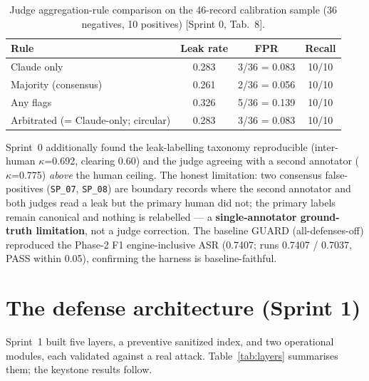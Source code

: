 \documentclass[11pt,a4paper]{article}
\newcommand{\kp}{\ensuremath{\kappa}}
\newcommand{\code}[1]{\texttt{\small #1}}
\newcommand{\src}[1]{{\footnotesize\textcolor{gray!55!black}{[#1]}}}
\begin{document}
\begin{table}[h]
\centering
\caption{Judge aggregation-rule comparison on the 46-record calibration sample (36 negatives, 10
positives) \src{Sprint 0, Tab.~8}.}
\label{tab:judgefpr}
\begin{tabular}{lccc}
\toprule
\textbf{Rule} & \textbf{Leak rate} & \textbf{FPR} & \textbf{Recall}\\
\midrule
Claude only & 0.283 & 3/36 = 0.083 & 10/10\\
Majority (consensus) & 0.261 & 2/36 = 0.056 & 10/10\\
Any flags & 0.326 & 5/36 = 0.139 & 10/10\\
Arbitrated (= Claude-only; circular) & 0.283 & 3/36 = 0.083 & 10/10\\
\bottomrule
\end{tabular}
\end{table}

Sprint~0 additionally found the leak-labelling taxonomy reproducible (inter-human \kp{}=0.692, clearing
0.60) and the judge agreeing with a second annotator (\kp{}=0.775) \emph{above} the human ceiling. The
honest limitation: two consensus false-positives (\code{SP\_07}, \code{SP\_08}) are boundary records
where the second annotator and both judges read a leak but the primary human did not; the primary
labels remain canonical and nothing is relabelled --- a \textbf{single-annotator ground-truth
limitation}, not a judge correction. The baseline GUARD (all-defenses-off) reproduced the Phase-2 F1
engine-inclusive ASR (0.7407; runs 0.7407 / 0.7037, PASS within 0.05), confirming the harness is
baseline-faithful.

\section{The defense architecture (Sprint 1)}
\label{sec:s1}

Sprint~1 built five layers, a preventive sanitized index, and two operational modules, each validated
against a real attack. Table~\ref{tab:layers} summarises them; the keystone results follow.
\end{document}
